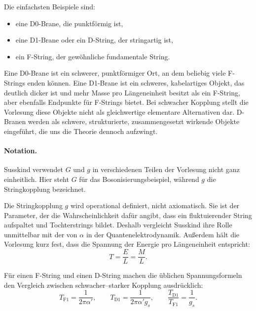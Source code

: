 Die einfachsten Beispiele sind:
\begin{itemize}
\item eine D0-Brane, die punktförmig ist,
\item eine D1-Brane oder ein D-String, der stringartig ist,
\item ein F-String, der gewöhnliche fundamentale String.
\end{itemize}
Eine D0-Brane ist ein schwerer, punktförmiger Ort, an dem beliebig viele F-Strings enden können. Eine D1-Brane ist ein schweres, kabelartiges Objekt, das deutlich dicker ist und mehr Masse pro Längeneinheit besitzt als ein F-String, aber ebenfalls Endpunkte für F-Strings bietet. Bei schwacher Kopplung stellt die Vorlesung diese Objekte nicht als gleichwertige elementare Alternativen dar. D-Branen werden als schwere, strukturierte, zusammengesetzt wirkende Objekte eingeführt, die uns die Theorie dennoch aufzwingt.


\paragraph{Notation.}
Susskind verwendet \(G\) und \(g\) in verschiedenen Teilen der Vorlesung nicht ganz einheitlich. Hier steht \(G\) für das Bosonisierungsbeispiel, während \(g\) die Stringkopplung bezeichnet.

Die Stringkopplung \(g\) wird operational definiert, nicht axiomatisch. Sie ist der Parameter, der die Wahrscheinlichkeit dafür angibt, dass ein fluktuierender String aufspaltet und Tochterstrings bildet. Deshalb vergleicht Susskind ihre Rolle unmittelbar mit der von \(\alpha\) in der Quantenelektrodynamik. Außerdem hält die Vorlesung kurz fest, dass die Spannung der Energie pro Längeneinheit entspricht:
\begin{equation}
T=\frac{E}{L}=\frac{M}{L}.
\end{equation}

Für einen F-String und einen D-String machen die üblichen Spannungsformeln den Vergleich zwischen schwacher--starker Kopplung ausdrücklich:
\begin{equation}
T_{\mathrm{F1}}=\frac{1}{2\pi\alpha'},
\qquad
T_{\mathrm{D1}}=\frac{1}{2\pi\alpha' g_s},
\qquad
\frac{T_{\mathrm{D1}}}{T_{\mathrm{F1}}}=\frac{1}{g_s}.
\end{equation}

